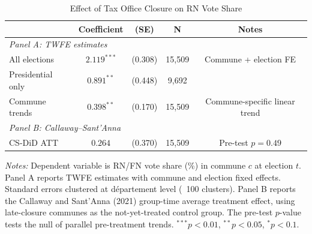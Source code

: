\begin{table}[htbp]
\centering
\caption{Effect of Tax Office Closure on RN Vote Share}
\label{tab:main}
\begin{tabular}{lcccc}
\toprule
 & Coefficient & (SE) & N & Notes \\
\midrule
\multicolumn{5}{l}{\textit{Panel A: TWFE estimates}} \\
All elections & $2.119^{***}$ & (0.308) & 15,509 & Commune + election FE \\
Presidential only & $0.891^{**}$ & (0.448) & 9,692 &  \\
Commune trends & $0.398^{**}$ & (0.170) & 15,509 & Commune-specific linear trend \\
\midrule
\multicolumn{5}{l}{\textit{Panel B: Callaway--Sant'Anna}} \\
CS-DiD ATT & $0.264$ & (0.370) & 15,509 & Pre-test $p = 0.49$ \\
\bottomrule
\end{tabular}
\begin{tablenotes}[flushleft]
\small
\item \textit{Notes:} Dependent variable is RN/FN vote share (\%) in commune $c$ at election $t$. Panel A reports TWFE estimates with commune and election fixed effects. Standard errors clustered at d\'epartement level (~100 clusters). Panel B reports the Callaway and Sant'Anna (2021) group-time average treatment effect, using late-closure communes as the not-yet-treated control group. The pre-test $p$-value tests the null of parallel pre-treatment trends. $^{***}p<0.01$, $^{**}p<0.05$, $^{*}p<0.1$.
\end{tablenotes}
\end{table}

